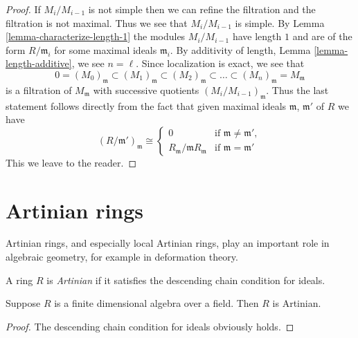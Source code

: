 \begin{proof}
If $M_i/M_{i-1}$ is not simple then we can refine the filtration
and the filtration is not maximal. Thus we see that $M_i/M_{i-1}$
is simple. By Lemma \ref{lemma-characterize-length-1} the modules
$M_i/M_{i-1}$ have length $1$ and are of the form $R/\mathfrak m_i$
for some maximal ideals $\mathfrak m_i$. By additivity of length,
Lemma \ref{lemma-length-additive}, we see $n = \ell$. Since localization
is exact, we see that
$$
0 = (M_0)_{\mathfrak m}
\subset (M_1)_{\mathfrak m}
\subset (M_2)_{\mathfrak m}
\subset \ldots
\subset (M_n)_{\mathfrak m} = M_{\mathfrak m}
$$
is a filtration of $M_{\mathfrak m}$ with successive quotients
$(M_i/M_{i-1})_{\mathfrak m}$. Thus the last statement follows
directly from the fact that given maximal ideals $\mathfrak m$,
$\mathfrak m'$ of $R$ we have
$$
(R/\mathfrak m')_{\mathfrak m}
\cong
\left\{
\begin{matrix}
0 &
\text{if } \mathfrak m \not = \mathfrak m', \\
R_{\mathfrak m}/\mathfrak m R_{\mathfrak m} &
\text{if } \mathfrak m  = \mathfrak m'
\end{matrix}
\right.
$$
This we leave to the reader.
\end{proof}














\section{Artinian rings}
\label{section-artinian}

\noindent
Artinian rings, and especially local Artinian rings,
play an important role in algebraic geometry, for example
in deformation theory.

\begin{definition}
\label{definition-artinian}
A ring $R$ is {\it Artinian} if it satisfies the 
descending chain condition for ideals.
\end{definition}

\begin{lemma}
\label{lemma-finite-dimensional-algebra}
Suppose $R$ is a finite dimensional algebra over a field.
Then $R$ is Artinian.
\end{lemma}

\begin{proof}
The descending chain condition for ideals obviously holds.
\end{proof}

